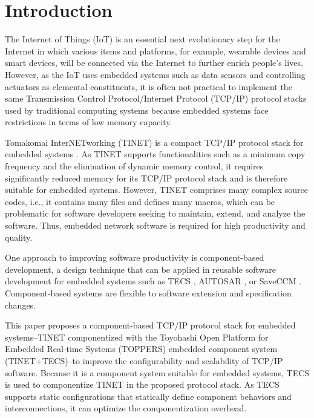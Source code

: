 \documentclass[conference]{IEEEtran/IEEEtran}
\begin{document}
\section{Introduction}
\label{sec:Introduction}

The Internet of Things (IoT) is an essential next evolutionary step for the Internet \cite{par:IoTIndustries} \cite{par:IoTComputing} in which various items and platforms, for example, wearable devices and smart devices, will be connected via the Internet to further enrich people's lives.
However, as the IoT uses embedded systems such as data sensors and controlling actuators as elemental constituents, it is often not practical to implement the same Transmission Control Protocol/Internet Protocol (TCP/IP) protocol stacks used by traditional computing systems because embedded systems face restrictions in terms of low memory capacity.

Tomakomai InterNETworking (TINET) is a compact TCP/IP protocol stack for embedded systems \cite{url:TINET}.
As TINET supports functionalities such as a minimum copy frequency and the elimination of dynamic memory control, it requires significantly reduced memory for its TCP/IP protocol stack and is therefore suitable for embedded systems.
However, TINET comprises many complex source codes, i.e., it contains many files and defines many macros, which can be problematic for software developers seeking to maintain, extend, and analyze the software.
Thus, embedded network software is required for high productivity and quality.

One approach to improving software productivity is component-based development, a design technique that can be applied in reusable software development for embedded systems \cite{par:Crnkovic}\cite{par:CBD} such as TECS \cite{par:TECS} \cite{par:hr-tecs}, AUTOSAR \cite{url:AUTOSAR}, or SaveCCM \cite{par:SAVEapproach}.
Component-based systems are flexible to software extension and specification changes.

This paper proposes a component-based TCP/IP protocol stack for embedded systems--TINET componentized with the Toyohashi Open Platform for Embedded Real-time Systems (TOPPERS) embedded component system (TINET+TECS)--to improve the configurability and scalability of TCP/IP software.
Because it is a component system suitable for embedded systems, TECS is used to componentize TINET in the proposed protocol stack.
As TECS supports static configurations that statically define component behaviors and interconnections, it can optimize the componentization overhead.
\end{document}
